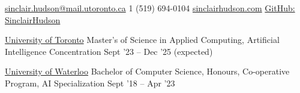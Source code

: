 \documentclass[10pt,a4paper]{article} %
\begin{document}
 



\noindent\href{mailto:sinclair.hudson@mail.utoronto.ca}{sinclair.hudson@mail.utoronto.ca}\bull %
\textsmaller{+}1 (519) 694-0104 \bull %
\href{http://www.sinclairhudson.com}{sinclairhudson.com} \bull
\href{https://github.com/SinclairHudson}{GitHub: SinclairHudson}

\spacedhrule{0.4em}{-0.4em} %

\headedsection %
{\href{https://www.utoronto.ca/}{University of Toronto}}
{\textsc{}} {
\headedsubsection %
{Master's of Science in Applied Computing, Artificial Intelligence Concentration}
{Sept '23 -- Dec '25 (expected)}
{}
}

\headedsection %
{\href{https://uwaterloo.ca/}{University of Waterloo}}
{\textsc{}} {
\headedsubsection %
{Bachelor of Computer Science, Honours, Co-operative Program, AI Specialization}
{Sept '18 -- Apr '23}
{}
}
\spacedhrule{0.4em}{-0.4em} %
\end{document}
